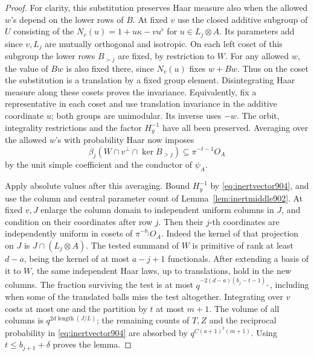 \documentclass[a4paper,11pt]{article}
\theoremstyle{definition}
\theoremstyle{remark}
\numberwithin{equation}{section}
\begin{document}
\begin{proof}
For clarity, this substitution preserves Haar measure also when
the allowed \(w\)'s depend on the lower rows of \(B\).
At fixed \(v\) use the closed additive subgroup of \(U\)
consisting of the \(N_v(u)=1+u\kappa-vu^\flat\) for
\(u\in L_j\otimes A\). Its parameters add since \(v,L_j\) are
mutually orthogonal and isotropic. On each left coset of this
subgroup the lower rows \(B_{>j}\) are fixed, by restriction
to \(W\). For any allowed \(w\), the value of \(Bw\) is also
fixed there, since \(N_v(u)\) fixes \(w+Bw\). Thus on the coset
the substitution is a translation by a fixed group element.
Disintegrating Haar measure along these cosets proves the
invariance. Equivalently, fix a representative in each coset
and use translation invariance in the additive coordinate \(u\);
both groups are unimodular. Its inverse uses \(-w\).
The orbit, integrality restrictions and the factor \(H_y^{-1}\)
have all been preserved. Averaging over the allowed \(w\)'s
with probability Haar now imposes
\[
        \beta_j(W\cap v^\perp\cap\ker B_{>j})
                                      \subseteq\pi^{-t-1}O_A
\]
by the unit simple coefficient and the conductor of \(\psi_A\).

Apply absolute values after this averaging. Bound \(H_y^{-1}\)
by \eqref{eq:inertvector904}, and use the column and central
parameter count of Lemma~\ref{lem:inertmiddle902}. At fixed
\(v,J\) enlarge the column domain to independent uniform
columns in \(J\), and condition on their coordinates after row
\(j\). Then their \(j\)-th coordinates are independently uniform
in cosets of \(\pi^{-b_j}O_A\). Indeed the kernel of that
projection on \(J\) is \(J\cap(L_j\otimes A)\). The tested
summand of \(W\) is primitive of rank at least \(d-a\), being
the kernel of at most \(a-j+1\) functionals. After extending
a basis of it to \(W\), the same independent Haar laws, up to
translations, hold in the new columns. The fraction surviving
the test is at most \(q^{-2(d-a)(b_j-t-1)_+}\), including when
some of the translated balls miss the test altogether.
Integrating over \(v\) costs at most one and the partition by
\(t\) at most \(m+1\). The volume of all columns is
\(q^{2d\operatorname{length}(J/L)}\); the remaining counts of
\(T,Z\) and the reciprocal probability in
\eqref{eq:inertvector904} are absorbed by
\(q^{C(a+1)^2(m+1)}\). Using \(t\le b_{j+1}+\delta\) proves
the lemma.
\end{proof}
\end{document}
